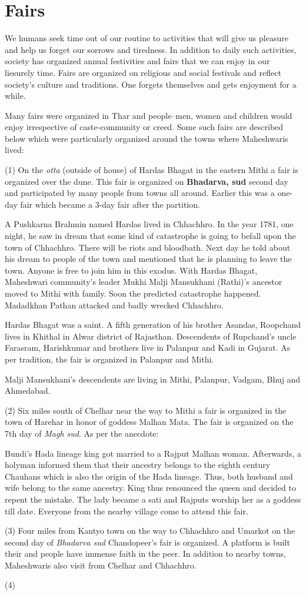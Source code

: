 \chapter{Fairs}
We humans seek time out of our routine to activities that will give us pleasure
and help us forget our sorrows and tiredness. In addition to daily such
activities, society has organized annual festivities and fairs that we can
enjoy in our liesurely time. Fairs are organized on religious and social
festivals and reflect society's culture and traditions. One forgets themselves
and gets enjoyment for a while.

Many fairs were organized in Thar and people--men, women and children would
enjoy irrespective of caste-community or creed. Some such fairs are described
below which were particularly organized around the towns where Maheshwaris
lived:

(1) On the \textit{otta} (outside of house) of Hardas Bhagat in the eastern
Mithi a fair is organized over the dune. This fair is organized on
\textbf{Bhadarva, sud} second day and participated by many people from towns
all around. Earlier this was a one-day fair which became a 3-day fair after the
partition.

A Pushkarna Brahmin named Hardas lived in Chhachhro. In the year 1781, one
night, he saw in dream that some kind of catastrophe is going to befall upon
the town of Chhachhro. There will be riots and bloodbath. Next day he told
about his dream to people of the town and mentioned that he is planning to
leave the town. Anyone is free to join him in this exodus. With Hardas Bhagat,
Maheshwari community's leader Mukhi Malji Mansukhani (Rathi)'s ancestor moved
to Mithi with family. Soon the predicted catastrophe happened. Madadkhan Pathan
attacked and badly wrecked Chhachhro.

Hardas Bhagat was a saint. A fifth generation of his brother Asandas, Roopchand
lives in Khithal in Alwar district of Rajasthan. Descendents of Rupchand's
uncle Farasram, Harishkumar and brothers live in Palanpur and Kadi in Gujarat.
As per tradition, the fair is organized in Palanpur and Mithi.

Malji Mansukhani's descendents are living in Mithi, Palanpur, Vadgam, Bhuj and
Ahmedabad.

(2) Six miles south of Chelhar near the way to Mithi a fair is organized in the
town of Harehar in honor of goddess Malhan Mata. The fair is organized on the
7th day of \textit{Magh sud}. As per the anecdote:

Bundi's Hada lineage king got married to a Rajput Malhan woman. Afterwards, a
holyman informed them that their ancestry belongs to the eighth century
Chauhans which is also the origin of the Hada lineage. Thus, both husband and
wife belong to the same ancestry. King thus renounced the queen and decided to
repent the mistake. The lady became a sati and Rajputs worship her as a goddess
till date. Everyone from the nearby village come to attend this fair.

(3) Four miles from Kantyo town on the way to Chhachhro and Umarkot on the
second day of \textit{Bhadarva sud} Chandopeer's fair is organized. A platform
is built their and people have immense faith in the peer. In addition to nearby
towns, Maheshwaris also visit from Chelhar and Chhachhro.

(4) 
